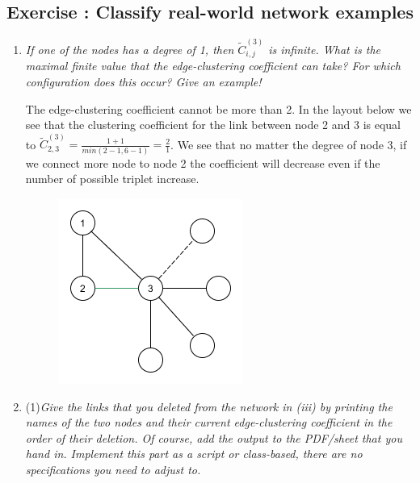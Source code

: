 \documentclass[10pt,a4paper]{article}
\newcommand{\exercise}[1]
{
  \stepcounter{subsection}
  \subsection*{Exercise \thesubsection: #1}

}
\begin{document}
\newpage
\exercise{Classify real-world network examples}
\begin{enumerate}
	\item \textit{If one of the nodes has a degree of 1, then $\tilde{C}_{i,j}^{(3)} $ is infinite. What is the maximal finite value that the edge-clustering coefficient can take? For which configuration does this occur? Give an example!}
	
	The edge-clustering coefficient cannot be more than 2. In the layout below we see that the clustering coefficient for the link between node 2 and 3 is equal to $\tilde{C}_{2,3}^{(3)} = \frac{1 + 1}{min(2 - 1, 6 - 1)} = \frac{2}{1}$. We see that no matter the degree of node 3, if we connect more node to node 2 the coefficient will decrease even if the number of possible triplet increase. 
	
	
\begin{figure}[H]
	\centering
	\includegraphics[width=0.5\linewidth]{expl}
	\caption{}
	\label{fig:expl}
\end{figure}
	
	
	\item (1)\textit{Give the links that you deleted from the network in (iii) by printing the names of the
		two nodes and their current edge-clustering coefficient in the order of their deletion. Of
		course, add the output to the PDF/sheet that you hand in. Implement this part as a
		script or class-based, there are no specifications you need to adjust to.}
	

\end{enumerate}
\end{document}
